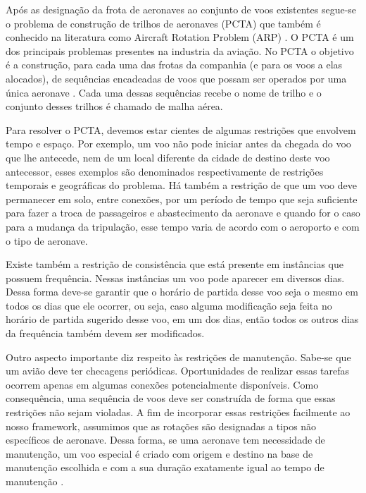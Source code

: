Após as designação da frota de aeronaves ao conjunto de voos existentes segue-se o problema de construção de trilhos de aeronaves (PCTA)  que também é conhecido na literatura como Aircraft Rotation Problem (ARP) . O PCTA é um dos principais problemas presentes na industria da aviação. No PCTA o objetivo é a construção, para cada uma das frotas da companhia (e para os voos a elas alocados), de sequências encadeadas de voos que possam ser operados por uma única aeronave \citep{abiliolivro}. Cada uma dessas sequências recebe o nome de trilho e o conjunto desses trilhos é chamado de malha aérea.

Para resolver o PCTA, devemos estar cientes de algumas restrições que envolvem tempo e espaço. Por exemplo, um voo não pode iniciar antes da chegada do voo que lhe antecede, nem de um local diferente da cidade de destino deste voo antecessor, esses exemplos são denominados respectivamente de restrições temporais e geográficas do problema. Há também a restrição de que um voo deve permanecer em solo, entre conexões, por um período de tempo que seja suficiente para fazer a troca de passageiros e abastecimento da aeronave e quando for o caso para a mudança da tripulação, esse tempo varia de acordo com o aeroporto e com o tipo de aeronave. 

Existe também a restrição de consistência que está presente em instâncias que possuem frequência. Nessas instâncias um voo pode aparecer em diversos dias. Dessa forma deve-se garantir que o horário de partida desse voo seja o mesmo em todos os dias que ele ocorrer, ou seja, caso alguma modificação seja feita no horário de partida sugerido desse voo, em um dos dias, então todos os outros dias da frequência também devem ser modificados.

Outro aspecto importante diz respeito às restrições de manutenção. Sabe-se que um avião deve ter checagens periódicas. Oportunidades de realizar essas tarefas ocorrem apenas em algumas conexões potencialmente disponíveis. Como consequência, uma sequência de voos deve ser construída de forma que essas restrições não sejam violadas. A fim de incorporar essas restrições facilmente ao nosso framework, assumimos que as rotações são designadas a tipos não específicos de aeronave. Dessa forma, se uma aeronave tem necessidade de manutenção, um voo especial é criado com origem e destino na base de manutenção escolhida e com a sua duração exatamente igual ao tempo de manutenção  \cite{pontes2002}.

